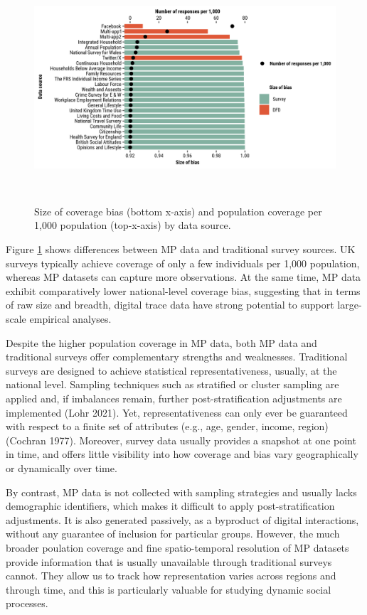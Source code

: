 \documentclass{article}
\begin{document}
\begin{figure}
\centering
\includegraphics[width=14.5cm,height=8.5cm]{figures/compare-surveys-two-axis.png}
\caption{Size of coverage bias (bottom x-axis) and population coverage per
1,000 population (top-x-axis) by data
source.}\label{fig:survey}
\end{figure}

Figure \ref{fig:survey} shows differences between MP data and
traditional survey sources. UK surveys typically achieve coverage of
only a few individuals per 1,000 population, whereas MP datasets can
capture more observations. At the same time, MP data exhibit
comparatively lower national-level coverage bias, suggesting that in
terms of raw size and breadth, digital trace data have strong potential
to support large-scale empirical analyses.

Despite the higher population coverage in MP data, both MP data and
traditional surveys offer complementary strengths and weaknesses.
Traditional surveys are designed to achieve statistical
representativeness, usually, at the national level. Sampling techniques
such as stratified or cluster sampling are applied and, if imbalances
remain, further post-stratification adjustments are implemented
(Lohr 2021). Yet, representativeness can only ever be guaranteed with
respect to a finite set of attributes (e.g., age, gender, income,
region) (Cochran 1977). Moreover, survey data usually provides a
snapshot at one point in time, and offers little visibility into how
coverage and bias vary geographically or dynamically over time.

By contrast, MP data is not collected with sampling strategies and
usually lacks demographic identifiers, which makes it difficult to apply
post-stratification adjustments. It is also generated passively, as a
byproduct of digital interactions, without any guarantee of inclusion
for particular groups. However, the much broader poulation coverage and
fine spatio-temporal resolution of MP datasets provide information that
is usually unavailable through traditional surveys cannot. They allow us
to track how representation varies across regions and through time, and
this is particularly valuable for studying dynamic social processes.
\end{document}
